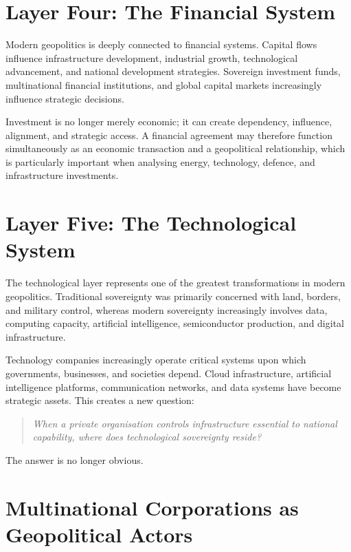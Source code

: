 \documentclass[11pt,openany]{book}
\theoremstyle{plain}
\theoremstyle{definition}
\begin{document}
\section*{Layer Four: The Financial System}

Modern geopolitics is deeply connected to financial systems. Capital flows influence infrastructure development, industrial growth, technological advancement, and national development strategies. Sovereign investment funds, multinational financial institutions, and global capital markets increasingly influence strategic decisions.

Investment is no longer merely economic; it can create dependency, influence, alignment, and strategic access. A financial agreement may therefore function simultaneously as an economic transaction and a geopolitical relationship, which is particularly important when analysing energy, technology, defence, and infrastructure investments.


\section*{Layer Five: The Technological System}

The technological layer represents one of the greatest transformations in modern geopolitics. Traditional sovereignty was primarily concerned with land, borders, and military control, whereas modern sovereignty increasingly involves data, computing capacity, artificial intelligence, semiconductor production, and digital infrastructure.

Technology companies increasingly operate critical systems upon which governments, businesses, and societies depend. Cloud infrastructure, artificial intelligence platforms, communication networks, and data systems have become strategic assets. This creates a new question:
\begin{quote}
\textit{When a private organisation controls infrastructure essential to national capability, where does technological sovereignty reside?}
\end{quote}

The answer is no longer obvious.


\section*{Multinational Corporations as Geopolitical Actors}
\end{document}
